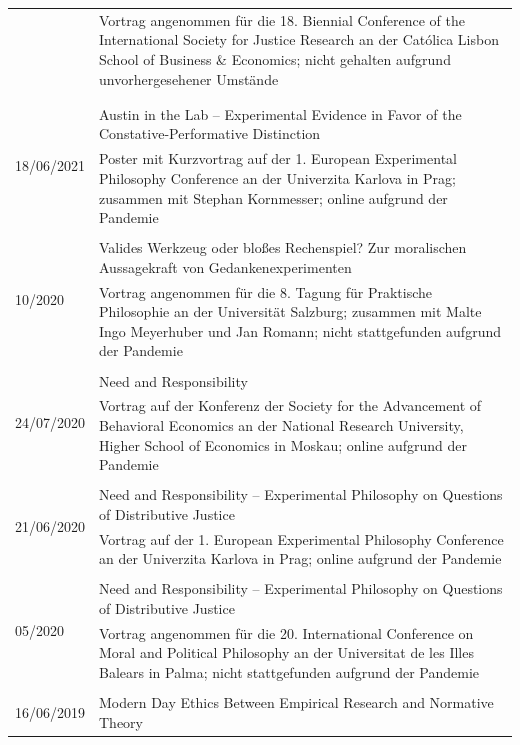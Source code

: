 \documentclass[a4paper,10pt]{article}
\begin{document}
\begin{longtable}{p{2.5cm}p{11cm}}
& \footnotesize{Vortrag angenommen für die 18. Biennial Conference of the International Society for Justice Research an der Católica Lisbon School of Business \& Economics; nicht gehalten aufgrund unvorhergesehener Umstände}\\
\\
\\ %
\multirow{2}{2.5cm}{\footnotesize{18/06/2021}} & Austin in the Lab -- Experimental Evidence in Favor of the Constative-Performative Distinction\\
& \footnotesize{Poster mit Kurzvortrag auf der 1. European Experimental Philosophy Conference an der Univerzita Karlova in Prag; zusammen mit Stephan Kornmesser; online aufgrund der Pandemie}\\
\\
\multirow{2}{2.5cm}{\footnotesize{10/2020}} & Valides Werkzeug oder bloßes Rechenspiel? Zur moralischen Aussagekraft von Gedankenexperimenten\\
& \footnotesize{Vortrag angenommen für die 8. Tagung für ​Praktische Philosophie an der Universität Salzburg; zusammen mit Malte Ingo Meyerhuber und Jan Romann; nicht stattgefunden aufgrund der Pandemie}\\
\\
\multirow{2}{2.5cm}{\footnotesize{24/07/2020}} & Need and Responsibility\\
& \footnotesize{Vortrag auf der Konferenz der Society for the Advancement of Behavioral Economics an der National Research University, Higher School of Economics in Moskau; online aufgrund der Pandemie}\\
\\
\multirow{2}{2.5cm}{\footnotesize{21/06/2020}} & Need and Responsibility -- Experimental Philosophy on Questions of Distributive Justice\\
& \footnotesize{Vortrag auf der 1. European Experimental Philosophy Conference an der Univerzita Karlova in Prag; online aufgrund der Pandemie}\\
\\
\multirow{2}{2.5cm}{\footnotesize{05/2020}} & Need and Responsibility -- Experimental Philosophy on Questions of Distributive Justice\\
& \footnotesize{Vortrag angenommen für die 20. International Conference on Moral and Political Philosophy an der Universitat de les Illes Balears in Palma; nicht stattgefunden aufgrund der Pandemie}\\
\\
\multirow{2}{2.5cm}{\footnotesize{16/06/2019}} & Modern Day Ethics Between Empirical Research and Normative Theory\\

\end{longtable}
\end{document}
